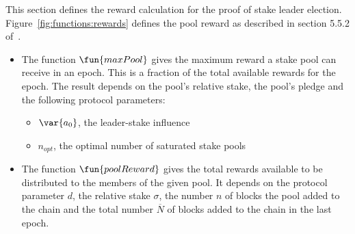 This section defines the reward calculation for the proof of stake leader election.
Figure~\ref{fig:functions:rewards} defines the pool reward as described in section
5.5.2 of~\cite{delegation_design}.

\begin{itemize}
  \item The function $\fun{maxPool}$ gives the maximum reward a stake pool can receive in an epoch.
    This is a fraction of the total available rewards for the epoch.
    The result depends on the pool's relative stake, the pool's pledge and the following
    protocol parameters:
    \begin{itemize}
      \item $\var{a_0}$, the leader-stake influence
      \item $n_{opt}$, the optimal number of saturated stake pools
    \end{itemize}
  \item The function $\fun{poolReward}$ gives the total rewards available to be
    distributed to the members of the given pool. It depends on the protocol parameter $d$,
    the relative stake $\sigma$, the number $n$ of blocks the pool added to the chain and the
    total number $\overline{N}$ of blocks added to the chain in the last epoch.

\end{itemize}

